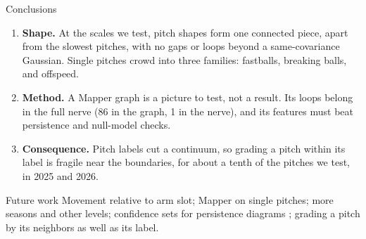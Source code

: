 \documentclass[aspectratio=169]{beamer}
\begin{document}
\begin{frame}{Conclusions}
\begin{enumerate}[<+->]
  \item \textbf{Shape.} At the scales we test, pitch shapes form one connected piece, apart from the slowest pitches, with no gaps or loops beyond a same-covariance Gaussian. Single pitches crowd into three families: fastballs, breaking balls, and offspeed.
  \item \textbf{Method.} A Mapper graph is a picture to test, not a result. Its loops belong in the full nerve (86 in the graph, 1 in the nerve), and its features must beat persistence and null-model checks.
  \item \textbf{Consequence.} Pitch labels cut a continuum, so grading a pitch within its label is fragile near the boundaries, for about a tenth of the pitches we test, in 2025 and 2026.
\end{enumerate}
\pause\vspace{6pt}
\begin{block}{Future work}
\small Movement relative to arm slot; Mapper on single pitches; more seasons and other levels; confidence sets for persistence diagrams \parencite{fasy2014confidence}; grading a pitch by its neighbors as well as its label.
\end{block}
\end{frame}
\end{document}

